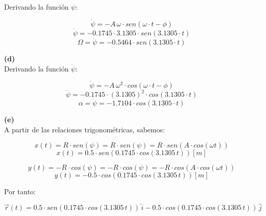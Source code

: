 \documentclass[letter,11pt]{article}
\begin{document}
Derivando la función $\psi$:

\begin{equation*}
    \dot{\psi} = - A\, \omega \cdot sen(\omega \cdot t - \phi)
\end{equation*}
\begin{equation*}
    \dot{\psi} = - 0.1745 \cdot 3.1305 \cdot sen(3.1305 \cdot t)
\end{equation*}
\begin{equation}
    \Omega = \dot{\psi} = - 0.5464 \cdot sen(3.1305 \cdot t)
\end{equation}

\textbf{(d)} \\

Derivando la función $\dot{\psi}$:

\begin{equation*}
    \ddot{\psi} = - A\, \omega^2 \cdot cos(\omega \cdot t - \phi)
\end{equation*}
\begin{equation*}
    \ddot{\psi} = -0.1745 \cdot (3.1305)^2 \cdot cos(3.1305 \cdot t)
\end{equation*}
\begin{equation}
    \alpha = \ddot{\psi} = -1.7104 \cdot cos(3.1305 \cdot t)
\end{equation}

\textbf{(e)} \\

A partir de las relaciones trigonométricas, sabemos:

\begin{equation*}
    x(t) = R \cdot sen (\psi) = R \cdot sen (\psi) = R \cdot sen(A \cdot cos(\omega t))
\end{equation*}
\begin{equation}
    x(t) = 0.5 \cdot sen ( 0.1745 \cdot cos (3.1305\, t) ) [m]
\end{equation}

\begin{equation*}
    y(t) = -R \cdot cos (\psi) = - R \cdot cos(\psi) = - R \cdot cos(A \cdot cos(\omega t))
\end{equation*}
\begin{equation}
    y(t) = - 0.5 \cdot cos ( 0.1745 \cdot cos (3.1305\, t) ) [m]
\end{equation}

Por tanto:

\begin{equation}
    \vec{r}(t) = 0.5 \cdot sen(0.1745 \cdot cos(3.1305\, t))\, \hat{i} - 0.5 \cdot cos(0.1745 \cdot cos(3.1305\, t))\, \hat{j}
\end{equation}
\end{document}
